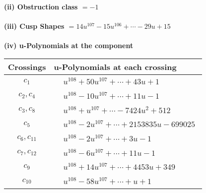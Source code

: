 \documentclass[1p]{elsarticle_modified}
\theoremstyle{definition}
\begin{document}
\flushleft \textbf{(ii) Obstruction class $= -1$}\\~\\
\flushleft \textbf{(iii) Cusp Shapes $= 14 u^{107}-15 u^{106}+\cdots-29 u+15$}\\~\\
\newpage\renewcommand{\arraystretch}{1}
\flushleft \textbf{(iv) u-Polynomials at the component}\newline \\
\begin{tabular}{m{50pt}|m{274pt}}
Crossings & \hspace{64pt}u-Polynomials at each crossing \\
\hline $$\begin{aligned}c_{1}\end{aligned}$$&$\begin{aligned}
&u^{108}+50 u^{107}+\cdots+43 u+1
\end{aligned}$\\
\hline $$\begin{aligned}c_{2},c_{4}\end{aligned}$$&$\begin{aligned}
&u^{108}-10 u^{107}+\cdots+11 u-1
\end{aligned}$\\
\hline $$\begin{aligned}c_{3},c_{8}\end{aligned}$$&$\begin{aligned}
&u^{108}+u^{107}+\cdots-7424 u^2+512
\end{aligned}$\\
\hline $$\begin{aligned}c_{5}\end{aligned}$$&$\begin{aligned}
&u^{108}-2 u^{107}+\cdots+2153835 u-699025
\end{aligned}$\\
\hline $$\begin{aligned}c_{6},c_{11}\end{aligned}$$&$\begin{aligned}
&u^{108}-2 u^{107}+\cdots+3 u-1
\end{aligned}$\\
\hline $$\begin{aligned}c_{7},c_{12}\end{aligned}$$&$\begin{aligned}
&u^{108}-6 u^{107}+\cdots+11 u-1
\end{aligned}$\\
\hline $$\begin{aligned}c_{9}\end{aligned}$$&$\begin{aligned}
&u^{108}+14 u^{107}+\cdots+4453 u+349
\end{aligned}$\\
\hline $$\begin{aligned}c_{10}\end{aligned}$$&$\begin{aligned}
&u^{108}-58 u^{107}+\cdots+u+1
\end{aligned}$\\
\hline
\end{tabular}\\~\\
\end{document}
